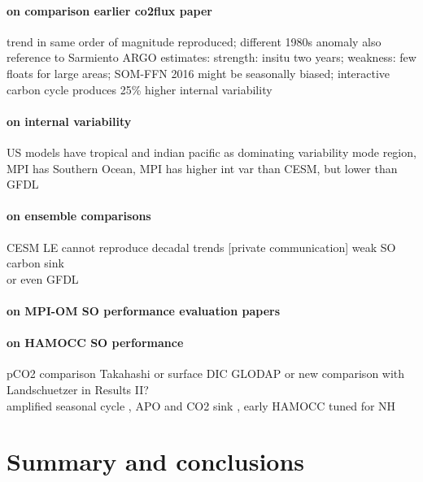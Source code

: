 \documentclass[12pt]{article}
\begin{document}
\paragraph{on comparison earlier co2flux paper} trend in same order of magnitude reproduced; different 1980s anomaly \citep{LeQuere2007,Lovenduski2007,landschuetzer2015} also reference to Sarmiento ARGO estimates: strength: insitu two years; weakness: few floats for large areas; SOM-FFN 2016 might be seasonally biased; interactive carbon cycle produces 25\% higher internal variability \citep{Ilyina2013}  

\paragraph{on internal variability} US models have tropical and indian pacific as dominating variability mode region, MPI has Southern Ocean, MPI has higher int var than CESM, but lower than GFDL \citep{Resplandy2015}

\paragraph{on ensemble comparisons} CESM LE cannot reproduce decadal trends [private communication] weak SO carbon sink \citep{McKinley2016} \\ or even GFDL \citep{Rodgers2015} 



\paragraph{on MPI-OM SO performance evaluation papers}  \citep{Jungclaus2013,Sallee2013,Sallee2013a,Heuze2013,Stoessel2015} 

\paragraph{on HAMOCC SO performance} pCO2 comparison Takahashi or surface DIC GLODAP \citep{Ilyina2013} or new comparison with Landschuetzer in Results II? \\ amplified seasonal cycle \citep{Nevison2016}, APO and CO2 sink \citep{Nevison2015}, early HAMOCC tuned for NH \citep{Six1996}




\clearpage

\section{Summary and conclusions}
\end{document}
